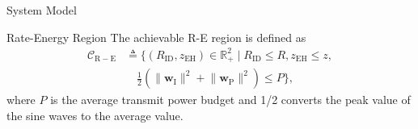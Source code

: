 \documentclass[journal]{IEEEtran}
\begin{document}
\begin{section}{System Model}
		\begin{subsection}{Rate-Energy Region}
			The achievable R-E region is defined as
			\begin{align}
				\mathcal{C}_{\mathrm{R-E}}
				&\triangleq \biggl\{(R_{\mathrm{ID}}, z_{\mathrm{EH}}) \in \mathbb{R}_+^2 \mid R_{\mathrm{ID}} \le R, z_{\mathrm{EH}} \le z,\nonumber\\
				&\quad \frac{1}{2}\left(\lVert{\boldsymbol{w}_{\mathrm{I}}}\rVert^2+\lVert{\boldsymbol{w}_{\mathrm{P}}}\rVert^2\right) \le P\biggr\},
			\end{align}
			where $P$ is the average transmit power budget and \num{1/2} converts the peak value of the sine waves to the average value.
		\end{subsection}
	\end{section}
\end{document}
